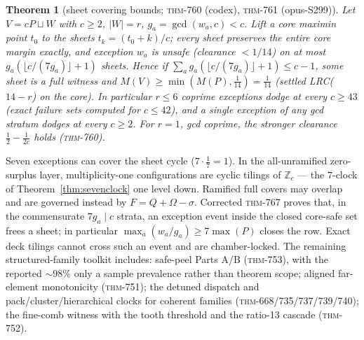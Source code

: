 \documentclass[11pt]{article}
\newtheorem{theorem}{Theorem}[section]
\theoremstyle{definition}
\newcommand{\Zb}{\mathbb{Z}}
\begin{document}
\begin{theorem}[sheet covering bounds; \textsc{thm}-760 (codex), \textsc{thm}-761
(opus-S299)]\label{thm:sheets}
Let $V=cP\sqcup W$ with $c\ge2$, $|W|=r$, $g_a=\gcd(w_a,c)<c$. Lift a core maximin point
$t_0$ to the sheets $t_k=(t_0+k)/c$; every sheet preserves the entire core margin exactly,
and exception $w_a$ is unsafe (clearance $<1/14$) on at most
$g_a(\lfloor c/(7g_a)\rfloor+1)$ sheets. Hence if
$\sum_a g_a(\lfloor c/(7g_a)\rfloor+1)\le c-1$, some sheet is a full witness and
$M(V)\ge\min(M(P),\tfrac1{14})=\tfrac1{14}$ (settled LRC($14-r$) on the core). In
particular $r\le6$ coprime exceptions dodge at every $c\ge43$ (exact failure sets computed
for $c\le42$), and a single exception of \emph{any} gcd stratum dodges at every $c\ge2$.
For $r=1$, gcd coprime, the stronger clearance $\tfrac12-\tfrac1{2c}$ holds
(\textsc{thm}-760).
\end{theorem}

Seven exceptions can cover the sheet cycle ($7\cdot\tfrac17=1$). In the
all-unramified zero-surplus layer, multiplicity-one configurations are cyclic
tilings of $\Zb_c$ --- the $7$-clock of Theorem~\ref{thm:sevenclock} one level
down. Ramified full covers may overlap and are governed instead by
$F=Q+\Omega-\sigma$. Corrected \textsc{thm}-767 proves that, in the commensurate $7g_a\mid c$ strata,
an exception event inside the closed core-safe set frees a sheet; in particular
$\max_a(w_a/g_a)\ge7\max(P)$ closes the row. Exact deck tilings cannot cross such an
event and are chamber-locked. The remaining structured-family toolkit includes:
safe-peel Parts A/B (\textsc{thm}-753), with the reported $\sim\!98\%$ only a sample
prevalence rather than theorem scope; aligned far-element monotonicity (\textsc{thm}-751); the
detuned dispatch and pack/cluster/hierarchical clocks for coherent families
(\textsc{thm}-668/735/737/739/740); the fine-comb witness with the tooth threshold and the
ratio-13 cascade (\textsc{thm}-752).
\end{document}
